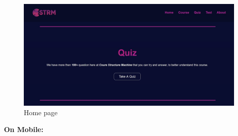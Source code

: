 \newpage
\begin{figure}[ht]
	\centering
	\label{}\includegraphics[scale=0.5]{img/2.jpg}                
	\caption{Home page} 
	\label{fig:UseCaseD}
\end{figure} 
\textbf{On Mobile:}
